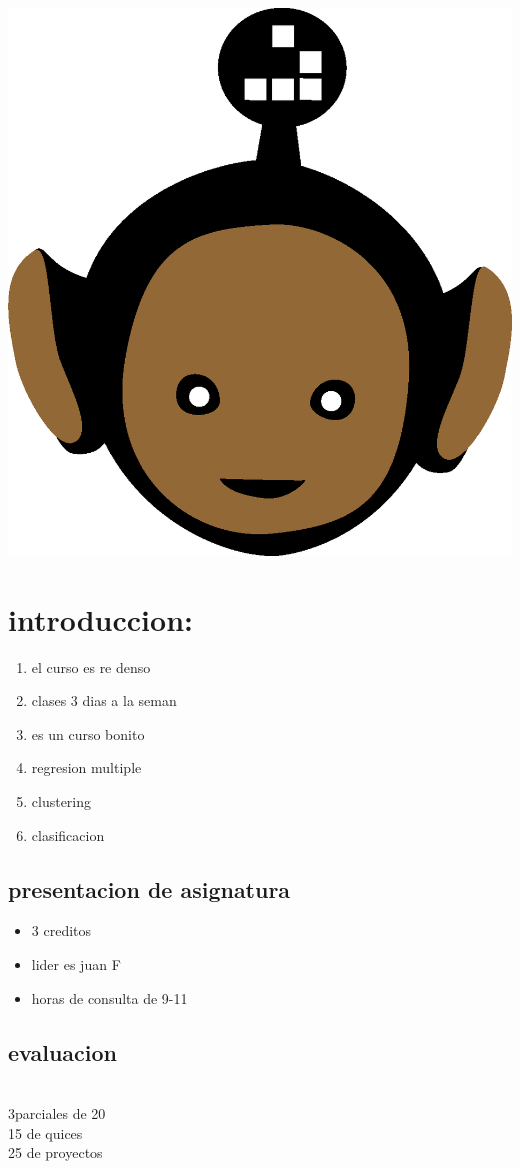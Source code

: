 \documentclass[10pt,a4paper]{article} %
\begin{document}
    \title{\rmfamily\normalfont{}}
    \author{}
    \date{\today} 
    
    \maketitle
     

    \includegraphics[width=0.1\linewidth]{negro_cara.png}
    \section{introduccion:}
        \begin{enumerate}
            \item {el curso es re denso} 
            \item {clases 3 dias a la seman} 
            \item {es un curso bonito} 
            \item {regresion multiple} 
            \item {clustering} 
            \item {clasificacion} 
        \end{enumerate}
        \subsection{presentacion de asignatura}
            \begin{itemize}
                \item {3 creditos} 
                \item {lider es juan F} 
                \item {horas de consulta de 9-11} 
            \end{itemize}	
            \subsection{evaluacion}
                \\ 3parciales de 20 
                \\ 15   de quices 
                \\ 25   de proyectos
\end{document}
